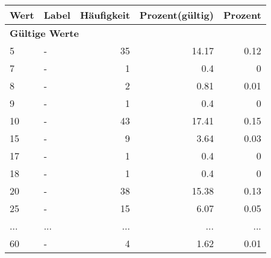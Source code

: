     \begin{longtable}{lXrrr}
     \toprule
     \textbf{Wert} & \textbf{Label} & \textbf{Häufigkeit} & \textbf{Prozent(gültig)} & \textbf{Prozent} \\
     \endhead
     \midrule
     \multicolumn{5}{l}{\textbf{Gültige Werte}}\\
        5 & \multicolumn{1}{X}{-} & %
          \num{35} &
          \num[round-mode=places,round-precision=2]{14.17} &
          \num[round-mode=places,round-precision=2]{0.12} \\
        7 & \multicolumn{1}{X}{-} & %
          \num{1} &
          \num[round-mode=places,round-precision=2]{0.4} &
          \num[round-mode=places,round-precision=2]{0} \\
        8 & \multicolumn{1}{X}{-} & %
          \num{2} &
          \num[round-mode=places,round-precision=2]{0.81} &
          \num[round-mode=places,round-precision=2]{0.01} \\
        9 & \multicolumn{1}{X}{-} & %
          \num{1} &
          \num[round-mode=places,round-precision=2]{0.4} &
          \num[round-mode=places,round-precision=2]{0} \\
        10 & \multicolumn{1}{X}{-} & %
          \num{43} &
          \num[round-mode=places,round-precision=2]{17.41} &
          \num[round-mode=places,round-precision=2]{0.15} \\
        15 & \multicolumn{1}{X}{-} & %
          \num{9} &
          \num[round-mode=places,round-precision=2]{3.64} &
          \num[round-mode=places,round-precision=2]{0.03} \\
        17 & \multicolumn{1}{X}{-} & %
          \num{1} &
          \num[round-mode=places,round-precision=2]{0.4} &
          \num[round-mode=places,round-precision=2]{0} \\
        18 & \multicolumn{1}{X}{-} & %
          \num{1} &
          \num[round-mode=places,round-precision=2]{0.4} &
          \num[round-mode=places,round-precision=2]{0} \\
        20 & \multicolumn{1}{X}{-} & %
          \num{38} &
          \num[round-mode=places,round-precision=2]{15.38} &
          \num[round-mode=places,round-precision=2]{0.13} \\
        25 & \multicolumn{1}{X}{-} & %
          \num{15} &
          \num[round-mode=places,round-precision=2]{6.07} &
          \num[round-mode=places,round-precision=2]{0.05} \\
       ... & ... & ... & ... & ... \\
        60 & \multicolumn{1}{X}{-} & %
          \num{4} &
          \num[round-mode=places,round-precision=2]{1.62} &
          \num[round-mode=places,round-precision=2]{0.01} \\


\end{longtable}
